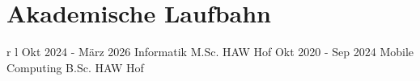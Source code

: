 
\section{Akademische Laufbahn}\label{sec: schulische-laufbahn}
\begin{supertabular}{r l} %
    \qualificationentry
    {Okt 2024 - März 2026}
    {Informatik M.Sc.}
    {}
    {}
    {HAW Hof}
    \qualificationentry
    {Okt 2020 - Sep 2024}
    {Mobile Computing B.Sc.}
    {}
    {}
    {HAW Hof}
\end{supertabular}

